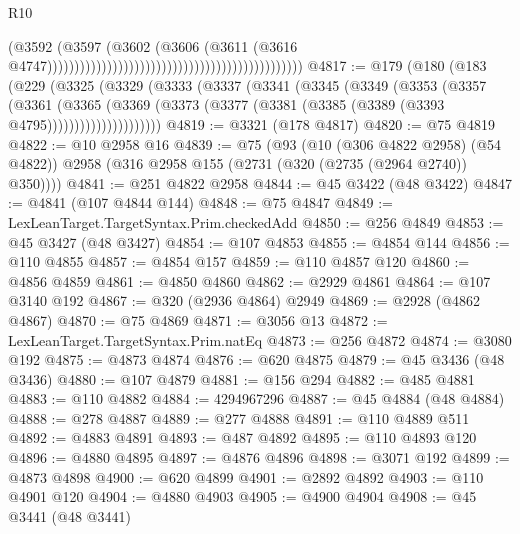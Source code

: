 \begin{lexlean}{R10}
\begin{coremodule}
                                                                                      (@3592
                                                                                        (@3597
                                                                                          (@3602
                                                                                            (@3606
                                                                                              (@3611
                                                                                                (@3616
                                                                                                  @4747)))))))))))))))))))))))))))))))))))))))))))))))
@4817 := @179
    (@180
      (@183
        (@229
          (@3325
            (@3329
              (@3333
                (@3337
                  (@3341
                    (@3345
                      (@3349
                        (@3353
                          (@3357
                            (@3361
                              (@3365
                                (@3369
                                  (@3373
                                    (@3377 (@3381 (@3385 (@3389 (@3393 @4795)))))))))))))))))))))
@4819 := @3321 (@178 @4817)
@4820 := @75 @4819
@4822 := @10 @2958 @16
@4839 := @75
    (@93
      (@10 (@306 @4822 @2958) (@54 @4822))
      @2958
      (@316 @2958 @155 (@2731 (@320 (@2735 (@2964 @2740)) @350))))
@4841 := @251 @4822 @2958
@4844 := @45 @3422 (@48 @3422)
@4847 := @4841 (@107 @4844 @144)
@4848 := @75 @4847
@4849 := LexLeanTarget.TargetSyntax.Prim.checkedAdd
@4850 := @256 @4849
@4853 := @45 @3427 (@48 @3427)
@4854 := @107 @4853
@4855 := @4854 @144
@4856 := @110 @4855
@4857 := @4854 @157
@4859 := @110 @4857 @120
@4860 := @4856 @4859
@4861 := @4850 @4860
@4862 := @2929 @4861
@4864 := @107 @3140 @192
@4867 := @320 (@2936 @4864) @2949
@4869 := @2928 (@4862 @4867)
@4870 := @75 @4869
@4871 := @3056 @13
@4872 := LexLeanTarget.TargetSyntax.Prim.natEq
@4873 := @256 @4872
@4874 := @3080 @192
@4875 := @4873 @4874
@4876 := @620 @4875
@4879 := @45 @3436 (@48 @3436)
@4880 := @107 @4879
@4881 := @156 @294
@4882 := @485 @4881
@4883 := @110 @4882
@4884 := 4294967296
@4887 := @45 @4884 (@48 @4884)
@4888 := @278 @4887
@4889 := @277 @4888
@4891 := @110 @4889 @511
@4892 := @4883 @4891
@4893 := @487 @4892
@4895 := @110 @4893 @120
@4896 := @4880 @4895
@4897 := @4876 @4896
@4898 := @3071 @192
@4899 := @4873 @4898
@4900 := @620 @4899
@4901 := @2892 @4892
@4903 := @110 @4901 @120
@4904 := @4880 @4903
@4905 := @4900 @4904
@4908 := @45 @3441 (@48 @3441)

\end{coremodule}
\end{lexlean}

